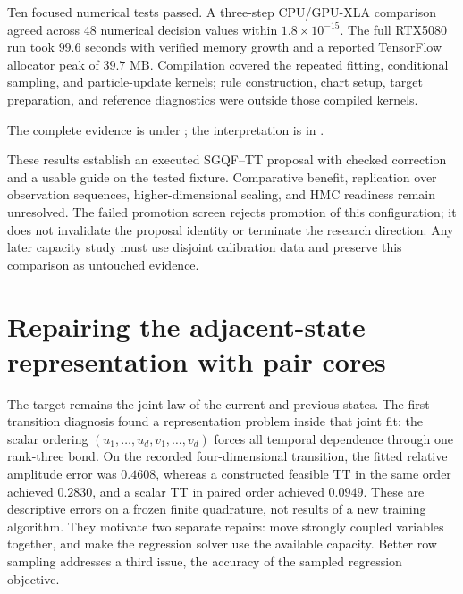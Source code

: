 \documentclass[11pt]{article}
\begin{document}
Ten focused numerical tests passed. A three-step CPU/GPU-XLA comparison
agreed across 48 numerical decision values within $1.8\times10^{-15}$.
The full RTX5080 run took $99.6$ seconds with verified memory growth and a
reported TensorFlow allocator peak of $39.7$ MB. Compilation covered the
repeated fitting, conditional sampling, and particle-update kernels; rule
construction, chart setup, target preparation, and reference diagnostics
were outside those compiled kernels.

\begingroup
\def\UrlBreaks{\do\/\do\_\do\-}
The complete evidence is under
;
the interpretation is in
.
\par\endgroup
These results establish an executed SGQF--TT proposal with checked correction
and a usable guide on the tested fixture. Comparative benefit, replication
over observation sequences, higher-dimensional scaling, and HMC readiness
remain unresolved. The failed promotion screen rejects promotion of this
configuration; it does not invalidate the proposal identity or terminate
the research direction. Any later capacity study must use disjoint
calibration data and preserve this comparison as untouched evidence.

\section{Repairing the adjacent-state representation with pair cores}
\label{sec:paired-repair}

The target remains the joint law of the current and previous states. The
first-transition diagnosis found a representation problem inside that joint
fit: the scalar ordering $(u_1,\ldots,u_d,v_1,\ldots,v_d)$ forces all temporal
dependence through one rank-three bond. On the recorded four-dimensional
transition, the fitted relative amplitude error was $0.4608$, whereas a
constructed feasible TT in the same order achieved $0.2830$, and a scalar TT
in paired order achieved $0.0949$. These are descriptive errors on a frozen
finite quadrature, not results of a new training algorithm. They motivate two
separate repairs: move strongly coupled variables together, and make the
regression solver use the available capacity. Better row sampling addresses
a third issue, the accuracy of the sampled regression objective.
\end{document}
